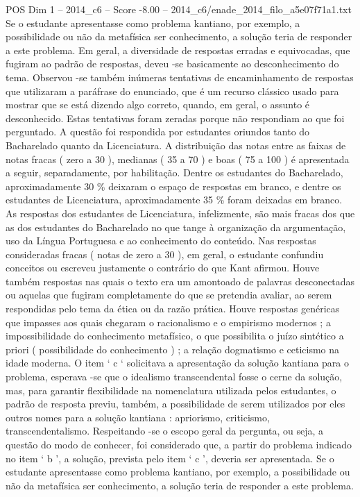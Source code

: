 \begin{textsample}{POS Dim 1 – 2014\_c6 – Score -8.00 – 2014\_c6/enade\_2014\_filo\_a5e07f71a1.txt}
Se o estudante apresentasse como problema kantiano, por exemplo, a possibilidade ou não da metafísica ser conhecimento, a solução teria de responder a este problema.
Em geral, a diversidade de respostas erradas e equivocadas, que fugiram ao padrão de respostas, deveu -se basicamente ao desconhecimento do tema.
Observou -se também inúmeras tentativas de encaminhamento de respostas que utilizaram a paráfrase do enunciado, que é um recurso clássico usado para mostrar que se está dizendo algo correto, quando, em geral, o assunto é desconhecido.
Estas tentativas foram zeradas porque não respondiam ao que foi perguntado.
A questão foi respondida por estudantes oriundos tanto do Bacharelado quanto da Licenciatura.
A distribuição das notas entre as faixas de notas fracas ( zero a 30 ), medianas ( 35 a 70 ) e boas ( 75 a 100 ) é apresentada a seguir, separadamente, por habilitação.
Dentre os estudantes do Bacharelado, aproximadamente 30 \% deixaram o espaço de respostas em branco, e dentre os estudantes de Licenciatura, aproximadamente 35 \% foram deixadas em branco.
As respostas dos estudantes de Licenciatura, infelizmente, são mais fracas dos que as dos estudantes do Bacharelado no que tange à organização da argumentação, uso da Língua Portuguesa e ao conhecimento do conteúdo.
Nas respostas consideradas fracas ( notas de zero a 30 ), em geral, o estudante confundiu conceitos ou escreveu justamente o contrário do que Kant afirmou.
Houve também respostas nas quais o texto era um amontoado de palavras desconectadas ou aquelas que fugiram completamente do que se pretendia avaliar, ao serem respondidas pelo tema da ética ou da razão prática.
Houve respostas genéricas que impasses aos quais chegaram o racionalismo e o empirismo modernos ; a impossibilidade do conhecimento metafísico, o que possibilita o juízo sintético a priori ( possibilidade do conhecimento ) ; a relação dogmatismo e ceticismo na idade moderna.
O item ‘ c ‘ solicitava a apresentação da solução kantiana para o problema, esperava -se que o idealismo transcendental fosse o cerne da solução, mas, para garantir flexibilidade na nomenclatura utilizada pelos estudantes, o padrão de resposta previu, também, a possibilidade de serem utilizados por eles outros nomes para a solução kantiana : apriorismo, criticismo, transcendentalismo.
Respeitando -se o escopo geral da pergunta, ou seja, a questão do modo de conhecer, foi considerado que, a partir do problema indicado no item ‘ b ’, a solução, prevista pelo item ‘ c ’, deveria ser apresentada.
Se o estudante apresentasse como problema kantiano, por exemplo, a possibilidade ou não da metafísica ser conhecimento, a solução teria de responder a este problema.

\end{textsample}
